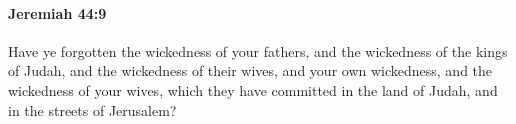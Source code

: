 
		\paragraph{Jeremiah 44:9} %
			\label{JEREMIAH-44-9}

			Have ye forgotten the wickedness of your fathers, and the wickedness of the kings of Judah, and the wickedness of their wives, and your own wickedness, and the wickedness of your wives, which they have committed in the land of Judah, and in the streets of Jerusalem?


